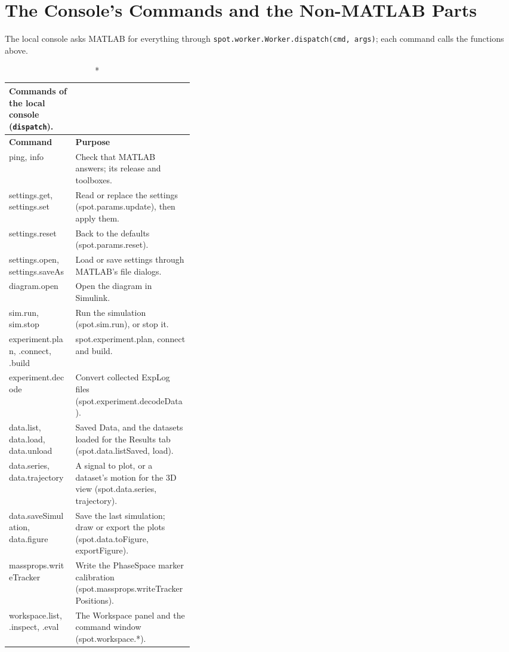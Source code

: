 \documentclass[11pt,a4paper]{article}
\newcommand{\fn}[1]{\texttt{#1}}
\begin{document}
\section{The Console's Commands and the Non-MATLAB Parts}
The local console asks MATLAB for everything through \fn{spot.worker.Worker.dispatch(cmd, args)}; each command calls the functions above.
\begin{xltabular}{\linewidth}{@{}>{\raggedright\arraybackslash\ttfamily\footnotesize}p{0.36\linewidth} >{\raggedright\arraybackslash\small}X@{}}
\caption*{Commands of the local console (\fn{dispatch}).}\\
\toprule \normalfont\small\textbf{Command} & \textbf{Purpose} \\ \midrule \endhead
ping, info & Check that MATLAB answers; its release and toolboxes. \\
settings.get, settings.set & Read or replace the settings (spot.params.update), then apply them. \\
settings.reset & Back to the defaults (spot.params.reset). \\
settings.open, settings.saveAs & Load or save settings through MATLAB's file dialogs. \\
diagram.open & Open the diagram in Simulink. \\
sim.run, sim.stop & Run the simulation (spot.sim.run), or stop it. \\
experiment.plan, .connect, .build & spot.experiment.plan, connect and build. \\
experiment.decode & Convert collected ExpLog files (spot.experiment.decodeData). \\
data.list, data.load, data.unload & Saved Data, and the datasets loaded for the Results tab (spot.data.listSaved, load). \\
data.series, data.trajectory & A signal to plot, or a dataset's motion for the 3D view (spot.data.series, trajectory). \\
data.saveSimulation, data.figure & Save the last simulation; draw or export the plots (spot.data.toFigure, exportFigure). \\
massprops.writeTracker & Write the PhaseSpace marker calibration (spot.massprops.writeTrackerPositions). \\
workspace.list, .inspect, .eval & The Workspace panel and the command window (spot.workspace.*). \\
\bottomrule\end{xltabular}
\end{document}
